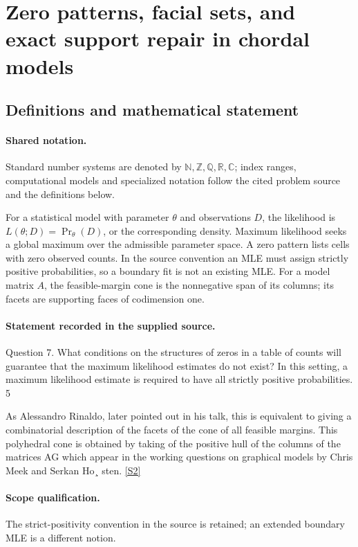 \documentclass[11pt]{article}
\newcommand{\sref}[2]{\hyperlink{source:#1:#2}{[S#2]}}
\begin{document}
\section{Zero patterns, facial sets, and exact support repair in chordal models}\label{statement}

\subsection{Definitions and mathematical statement}

\paragraph{Shared notation.}Standard number systems are denoted by $\mathbb N,\mathbb Z,\mathbb Q,\mathbb R,\mathbb C$; index ranges, computational models and specialized notation follow the cited problem source and the definitions below.


For a statistical model with parameter $\theta$ and observations $D$, the likelihood is $L(\theta;D)=\Pr_\theta(D)$, or the corresponding density. Maximum likelihood seeks a global maximum over the admissible parameter space. A zero pattern lists cells with zero observed counts. In the source convention an MLE must assign strictly positive probabilities, so a boundary fit is not an existing MLE. For a model matrix $A$, the feasible-margin cone is the nonnegative span of its columns; its facets are supporting faces of codimension one.
\paragraph{Statement recorded in the supplied source.}
Question 7. What conditions on the structures of zeros in a table of counts will guarantee that the maximum likelihood estimates do not exist? In this setting, a maximum likelihood estimate is required to have all strictly positive probabilities. 5

As Alessandro Rinaldo, later pointed out in his talk, this is equivalent to giving a combinatorial description of the facets of the cone of all feasible margins. This polyhedral cone is obtained by taking of the positive hull of the columns of the matrices AG which appear in the working questions on graphical models by Chris Meek and Serkan Ho¸ sten. \sref{statement}{2}
\paragraph{Scope qualification.}
The strict-positivity convention in the source is retained; an extended boundary MLE is a different notion.
\end{document}
